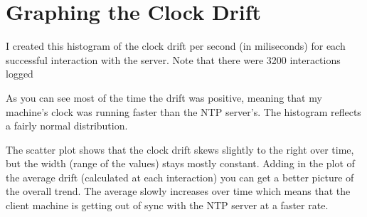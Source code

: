\documentclass[letterpaper,10pt,english]{sphinxmanual}
\begin{document}
\section{Graphing the Clock Drift}
\label{\detokenize{clock_exercise/clock_exercise:graphing-the-clock-drift}}
I created this histogram of the clock drift per second (in miliseconds) for each
successful interaction with the server. Note that there were 3200 interactions logged



As you can see most of the time the drift was positive, meaning that my machine’s
clock was running faster than the NTP server’s. The histogram reflects a fairly normal distribution.



The scatter plot shows that the clock drift skews slightly to the right over time, but the width
(range of the values) stays mostly constant. Adding in the plot of the average drift (calculated at
each interaction) you can get a better picture of the overall trend. The average slowly increases over time
which means that the client machine is getting out of sync with the NTP server at a faster rate.
\end{document}
